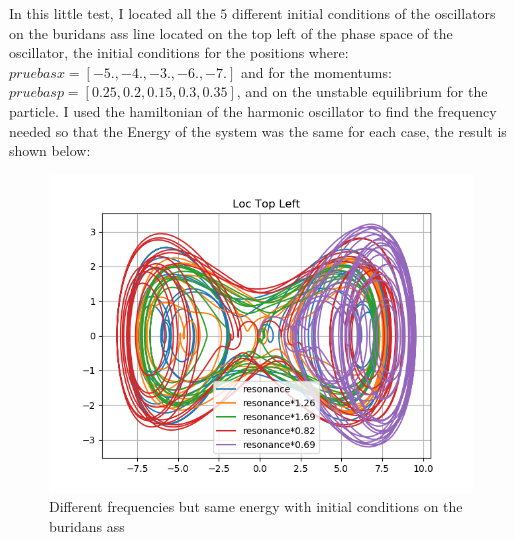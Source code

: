 \documentclass[idxtotoc,hyperref,openany]{labbook} %
\begin{document}
In this little test, I located all the $5$ different initial conditions of the oscillators on the buridans ass line located on the top left of the phase space of the oscillator, the initial conditions for the positions where: $pruebasx=[-5.,-4.,-3.,-6.,-7.]$ and for the momentums: $pruebasp=[0.25,0.2,0.15,0.3,0.35]$, and on the unstable equilibrium for the particle. I used the hamiltonian of the harmonic oscillator to find the frequency needed so that the Energy of the system was the same for each case, the result is shown below:
\begin{figure}[H] %
\begin{center}
\includegraphics[width=1\linewidth]{different_freqs_200dt.png}
\end{center}
\caption{Different frequencies but same energy with initial conditions on the buridans ass}
\label{fig:diff_freq_same_energy}
\end{figure}
\end{document}
